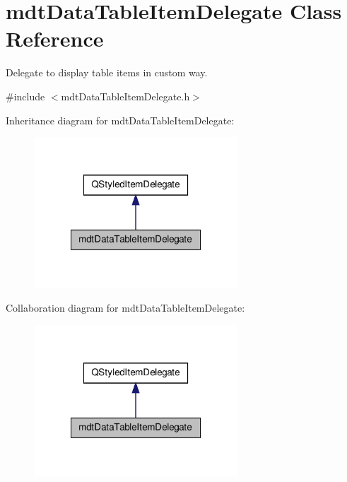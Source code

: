 \hypertarget{classmdt_data_table_item_delegate}{\section{mdt\-Data\-Table\-Item\-Delegate Class Reference}
\label{classmdt_data_table_item_delegate}
}


Delegate to display table items in custom way.  




{\ttfamily \#include $<$mdt\-Data\-Table\-Item\-Delegate.\-h$>$}



Inheritance diagram for mdt\-Data\-Table\-Item\-Delegate\-:
\nopagebreak
\begin{figure}[H]
\begin{center}
\leavevmode
\includegraphics[width=216pt]{classmdt_data_table_item_delegate__inherit__graph}
\end{center}
\end{figure}


Collaboration diagram for mdt\-Data\-Table\-Item\-Delegate\-:
\nopagebreak
\begin{figure}[H]
\begin{center}
\leavevmode
\includegraphics[width=216pt]{classmdt_data_table_item_delegate__coll__graph}
\end{center}
\end{figure}
